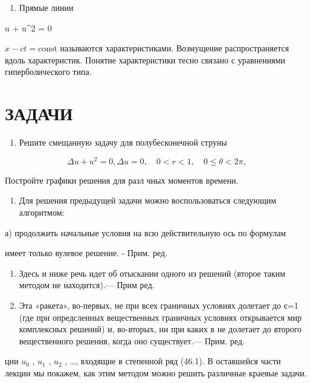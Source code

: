 \documentclass[
  ukrainian,
]{article}
\providecommand{\tightlist}{%
  \setlength{\itemsep}{0pt}\setlength{\parskip}{0pt}}
\begin{document}
\begin{enumerate}
\def\labelenumi{\arabic{enumi}.}
\setcounter{enumi}{2}
\tightlist
\item
  Прямые линии
\end{enumerate}

 u + u\^{}2 = 0

\(x - ct = \text{const}\) называются характеристиками. Возмущение
распространяется вдоль характеристик. Понятие характеристики тесно
связано с уравнениями гиперболического типа.

\section{ЗАДАЧИ}\label{ux437ux430ux434ux430ux447ux438-1}

\begin{enumerate}
\def\labelenumi{\arabic{enumi}.}
\tightlist
\item
  Решите смещанную задачу для полубесконечной струны
\end{enumerate}

\[
\Delta u + u^2 = 0,
\Delta u = 0, \quad 0 < r < 1, \quad 0 \le \theta < 2\pi,
\]

Постройте графики решения для разл чных моментов времени.

\begin{enumerate}
\def\labelenumi{\arabic{enumi}.}
\setcounter{enumi}{1}
\tightlist
\item
  Для решения предыдущей задачи можно воспользоваться следующим
  алгоритмом:
\end{enumerate}

а) продолжить начальные условия на всю действительную ось по формулам

имеет только вулевое решение. - Прим. ред.

\begin{enumerate}
\def\labelenumi{\arabic{enumi})}
\setcounter{enumi}{1}
\item
  Здесь и ниже речь идет об отыскании одного из решений (второе таким
  методом не находится).--- Прим ред.
\item
  Эта «ракета», во-первых, не при всех граничных условиях долетает до
  є=1 (где при опредсленных вещественных граничных условиях открывается
  мир комплексных решений) и, во-вторых, ни при каких в не долетает до
  второго вещественного решения, когда оно существует.--- Прим. ред.
\end{enumerate}

ции \(u_0\) , \(u_1\) , \(u_2\) , \ldots, входящие в степенной ряд
(46.1). В оставшейся части лекции мы покажем, как этим методом можно
решить различные краевые задачи.
\end{document}
